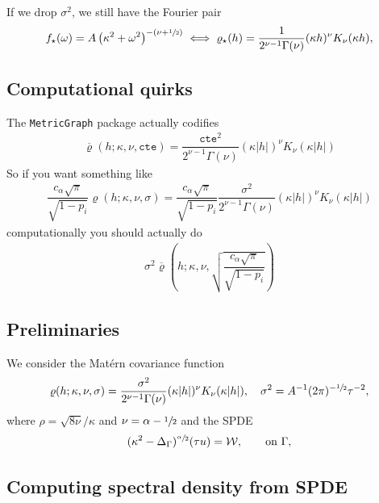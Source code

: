 \documentclass[11pt,a4paper]{article}
\theoremstyle{plain}
\theoremstyle{definition}
\begin{document}
If we drop $\sigma^2$, we still have the Fourier pair
\begin{align}
    f_\star(\omega) = A\left(\kappa^2+\omega^2\right)^{-(\nu+\sfrac{1}{2})}\iff \varrho_\star(h) = \dfrac{1}{2^{\nu-1}\Gamma(\nu)}(\kappa h)^\nu K_\nu(\kappa h), 
\end{align}


\newpage
\subsection{Computational quirks}
The \texttt{MetricGraph} package actually codifies
\begin{align}
\overline{\varrho}(h; \kappa, \nu, \texttt{cte})=\dfrac{\texttt{cte}^{2}}{2^{\nu-1} \Gamma(\nu)}(\kappa|h|)^\nu K_\nu(\kappa|h|)
\end{align}
So if you want something like 
\begin{align}
    \dfrac{c_\alpha \sqrt{\pi}}{\sqrt{1-p_i}}\varrho(h; \kappa, \nu, \sigma) = \dfrac{c_\alpha \sqrt{\pi}}{\sqrt{1-p_i}} \dfrac{\sigma^{2}}{2^{\nu-1} \Gamma(\nu)}(\kappa|h|)^\nu K_\nu(\kappa|h|)
\end{align}
computationally you should actually do
\begin{align}
    \sigma^2 \overline{\varrho}\left(h; \kappa, \nu, \sqrt{ \dfrac{c_\alpha \sqrt{\pi}}{\sqrt{1-p_i}}}\right)
\end{align}


\subsection{Preliminaries}

We consider the Matérn covariance function
\begin{align}
\label{eq:Matern_cov_fun}
\varrho(h; \kappa, \nu, \sigma)=\dfrac{\sigma^{2}}{2^{\nu-1} \Gamma(\nu)}(\kappa|h|)^\nu K_\nu(\kappa|h|),\quad \sigma^2 = A^{-1}(2\pi)^{-\sfrac{1}{2}}\tau^{-2},
\end{align}
where $\rho = \sqrt{8\nu}/\kappa$ and $\nu = \alpha-\sfrac{1}{2}$
and the SPDE
\begin{equation}
\label{eq:Matern_spde}
	(\kappa^2 - \Delta_\Gamma)^{\sfrac{\alpha}{2}} (\tau u) = \mathcal{W}, \qquad \text{on $\Gamma$},
\end{equation}


\subsection{Computing spectral density from SPDE}
\end{document}
